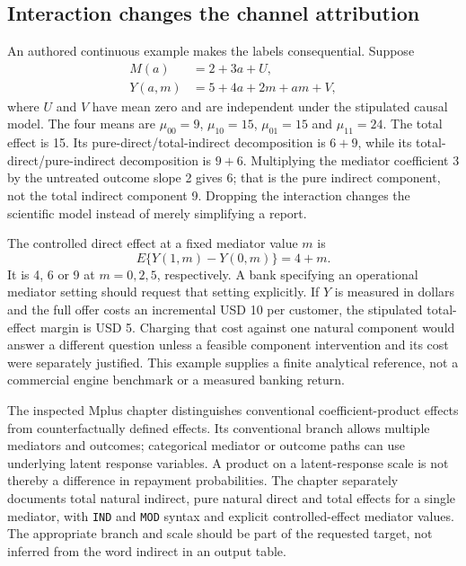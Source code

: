 \subsection{Interaction changes the channel attribution}
\label{exec20:med-interaction}
An authored continuous example makes the labels consequential. Suppose
\begin{align}
 M(a)&=2+3a+U,\nonumber\\
 Y(a,m)&=5+4a+2m+am+V,
 \label{exec20:med-law}
\end{align}
where $U$ and $V$ have mean zero and are independent under the stipulated causal model. The four means are $\mu_{00}=9$, $\mu_{10}=15$, $\mu_{01}=15$ and $\mu_{11}=24$. The total effect is 15. Its pure-direct/total-indirect decomposition is $6+9$, while its total-direct/pure-indirect decomposition is $9+6$. Multiplying the mediator coefficient 3 by the untreated outcome slope 2 gives 6; that is the pure indirect component, not the total indirect component 9. Dropping the interaction changes the scientific model instead of merely simplifying a report.~\citep{exec20_med_reference}

The controlled direct effect at a fixed mediator value $m$ is
\begin{equation}
 E\{Y(1,m)-Y(0,m)\}=4+m.
 \label{exec20:med-controlled}
\end{equation}
It is 4, 6 or 9 at $m=0,2,5$, respectively. A bank specifying an operational mediator setting should request that setting explicitly. If $Y$ is measured in dollars and the full offer costs an incremental USD 10 per customer, the stipulated total-effect margin is USD 5. Charging that cost against one natural component would answer a different question unless a feasible component intervention and its cost were separately justified. This example supplies a finite analytical reference, not a commercial engine benchmark or a measured banking return.

The inspected Mplus chapter distinguishes conventional coefficient-product effects from counterfactually defined effects. Its conventional branch allows multiple mediators and outcomes; categorical mediator or outcome paths can use underlying latent response variables. A product on a latent-response scale is not thereby a difference in repayment probabilities. The chapter separately documents total natural indirect, pure natural direct and total effects for a single mediator, with \texttt{IND} and \texttt{MOD} syntax and explicit controlled-effect mediator values. The appropriate branch and scale should be part of the requested target, not inferred from the word indirect in an output table.~\citep{exec20_med_mplus_ch17}

